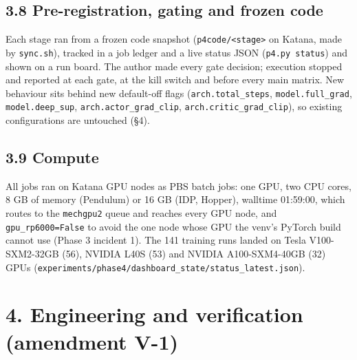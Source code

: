 \documentclass[11pt]{article}
\begin{document}
\subsection*{3.8 Pre-registration, gating and frozen code}



Each stage ran from a frozen code snapshot (\texttt{p4code/\allowbreak{}<stage>} on Katana, made by \texttt{sync.sh}), tracked in a job ledger and a live status JSON (\texttt{p4.py status}) and shown on a run board. The author made every gate decision; execution stopped and reported at each gate, at the kill switch and before every main matrix. New behaviour sits behind new default-off flags (\texttt{arch.\allowbreak{}total\_\allowbreak{}steps}, \texttt{model.\allowbreak{}full\_\allowbreak{}grad}, \texttt{model.\allowbreak{}deep\_\allowbreak{}sup}, \texttt{arch.\allowbreak{}actor\_\allowbreak{}grad\_\allowbreak{}clip}, \texttt{arch.\allowbreak{}critic\_\allowbreak{}grad\_\allowbreak{}clip}), so existing configurations are untouched (\S{}4).



\subsection*{3.9 Compute}



All jobs ran on Katana GPU nodes as PBS batch jobs: one GPU, two CPU cores, 8 GB of memory (Pendulum) or 16 GB (IDP, Hopper), walltime 01:59:00, which routes to the \texttt{mechgpu2} queue and reaches every GPU node, and \texttt{gpu\_\allowbreak{}rp6000=False} to avoid the one node whose GPU the venv's PyTorch build cannot use (Phase 3 incident 1). The 141 training runs landed on Tesla V100-SXM2-32GB (56), NVIDIA L40S (53) and NVIDIA A100-SXM4-40GB (32) GPUs (\texttt{experiments/\allowbreak{}phase4/\allowbreak{}dashboard\_\allowbreak{}state/\allowbreak{}status\_\allowbreak{}latest.\allowbreak{}json}).



\section*{4. Engineering and verification (amendment V-1)}
\end{document}
